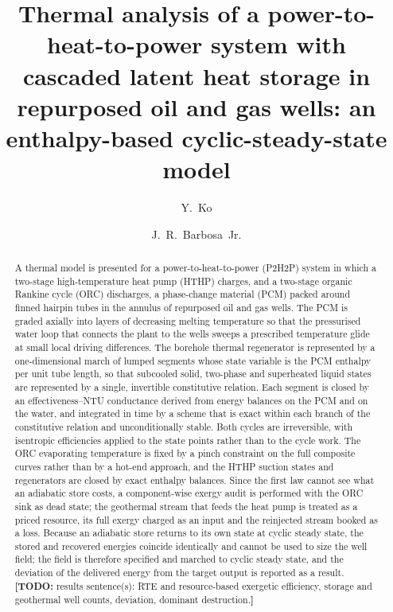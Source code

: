 \documentclass[preprint,12pt]{elsarticle}
\newcommand{\todo}[1]{\textcolor{red!70!black}{\textbf{[TODO:} #1\textbf{]}}}
\begin{document}
\begin{frontmatter}

\title{Thermal analysis of a power-to-heat-to-power system with cascaded
latent heat storage in repurposed oil and gas wells: an enthalpy-based
cyclic-steady-state model}

\author[lsu]{Y.~Ko}
\author[lsu]{J.~R.~Barbosa~Jr.}
\address[lsu]{Craft \& Hawkins Department of Petroleum Engineering,
Louisiana State University, Baton Rouge, LA 70803, USA}

\begin{abstract}
A thermal model is presented for a power-to-heat-to-power (P2H2P) system in
which a two-stage high-temperature heat pump (HTHP) charges, and a two-stage
organic Rankine cycle (ORC) discharges, a phase-change material (PCM) packed
around finned hairpin tubes in the annulus of repurposed oil and gas wells.
The PCM is graded axially into layers of decreasing melting temperature so
that the pressurised water loop that connects the plant to the wells sweeps
a prescribed temperature glide at small local driving differences. The
borehole thermal regenerator is represented by a one-dimensional march of
lumped segments whose state variable is the PCM enthalpy per unit tube
length, so that subcooled solid, two-phase and superheated liquid states are
represented by a single, invertible constitutive relation. Each segment is
closed by an effectiveness--NTU conductance derived from energy balances on
the PCM and on the water, and integrated in time by a scheme that is exact
within each branch of the constitutive relation and unconditionally stable.
Both cycles are irreversible, with isentropic efficiencies applied to the
state points rather than to the cycle work. The ORC evaporating temperature is
fixed by a pinch constraint on the full composite curves rather than by a
hot-end approach, and the HTHP suction states and regenerators are closed by
exact enthalpy balances. Since the first law cannot see what an adiabatic
store costs, a component-wise exergy audit is performed with the ORC sink as
dead state; the geothermal stream that feeds the heat pump is treated as a
priced resource, its full exergy charged as an input and the reinjected
stream booked as a loss. Because an adiabatic store returns
to its own state at cyclic steady state, the stored and recovered energies
coincide identically and cannot be used to size the well field; the field is
therefore specified and marched to cyclic steady state, and the deviation of
the delivered energy from the target output is reported as a result.
\todo{results sentence(s): RTE and resource-based exergetic efficiency,
storage and geothermal well counts, deviation, dominant destruction.}
\end{abstract}


\end{frontmatter}
\end{document}
